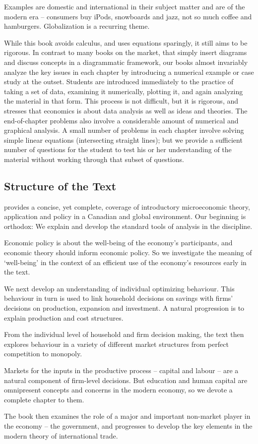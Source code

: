 Examples are domestic and international in their subject matter and are of the modern era -- consumers buy iPods, snowboards and jazz, not so much coffee and hamburgers. Globalization is a recurring theme.

While this book avoids calculus, and uses equations sparingly, it still aims to be rigorous. In contrast to many books on the market, that simply insert diagrams and discuss concepts in a diagrammatic framework, our books almost invariably analyze the key issues in each chapter by introducing a numerical example or case study at the outset. Students are introduced immediately to the practice of taking a set of data, examining it numerically, plotting it, and again analyzing the material in that form. This process is not difficult, but it is rigorous, and stresses that economics is about data analysis as well as ideas and theories. The end-of-chapter problems also involve a considerable amount of numerical and graphical analysis. A small number of problems in each chapter involve solving simple linear equations (intersecting straight lines); but we provide a sufficient number of questions for the student to test his or her understanding of the material without working through that subset of questions. 

\subsection*{Structure of the Text}

\emph{\booktitle} provides a concise, yet complete, coverage of introductory microeconomic theory, application and policy in a Canadian and global environment. Our beginning is orthodox: We explain and develop the standard tools of analysis in the discipline.

Economic policy is about the well-being of the economy's participants, and economic theory should inform economic policy. So we investigate the meaning of `well-being' in the context of an efficient use of the economy's resources early in the text.

We next develop an understanding of individual optimizing behaviour. This behaviour in turn is used to link household decisions on savings with firms' decisions on production, expansion and investment. A natural progression is to explain production and cost structures.

From the individual level of household and firm decision making, the text then explores behaviour in a variety of different market structures from perfect competition to monopoly.

Markets for the inputs in the productive process -- capital and labour -- are a natural component of firm-level decisions. But education and human capital are omnipresent concepts and concerns in the modern economy, so we devote a complete chapter to them.

The book then examines the role of a major and important non-market player in the economy -- the government, and progresses to develop the key elements in the modern theory of international trade.